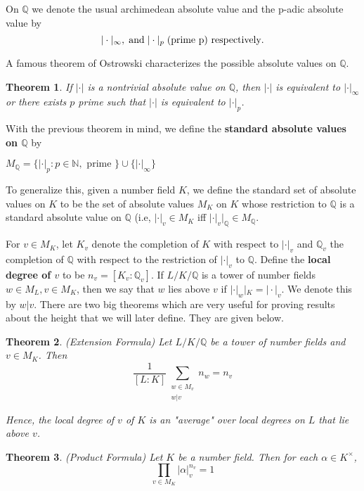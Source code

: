 \documentclass{amsart}
\newtheorem{thm}{Theorem}[section]
\newcommand{\N}{\mathbb{N}}
\newcommand{\Q}{\mathbb{Q}}
\begin{document}
On $\Q$ we denote the usual archimedean absolute value and the p-adic absolute value by $$|\cdot |_{\infty}, \hspace{1mm} \text{and} \hspace{1mm}  |\cdot |_p\hspace{1mm} \text{(prime p) respectively}.$$

A famous theorem of Ostrowski characterizes the possible absolute values on $\Q$. 

\begin{thm}
If $| \cdot |$ is a nontrivial absolute value on $\Q$, then  $| \cdot |$ is equivalent to  $| \cdot |_{\infty}$ or there exists $p$ prime such that  $| \cdot |$ is equivalent to  $| \cdot |_p$. 
\end{thm}


With the previous theorem in mind, we define the \textbf{standard absolute values on $\Q$} by 

$M_{\Q}=\{  | \cdot |_p : p \in \N, \text{ prime }\} \cup \{ | \cdot |_{\infty}\}$

To generalize this, given a number field $K$, we define the standard set of absolute values on $K$ to be the set of absolute values $M_K$ on $K$ whose restriction to $\Q$  is a standard absolute value on $\Q$ (i.e, $|\cdot|_v \in M_K$ iff $|\cdot|_v|_{\Q} \in M_{\Q}$. 

For $v \in M_K$, let $K_v$ denote the completion of $K$ with respect to  $| \cdot |_v$ and $\Q_v$ the completion of $\Q$ with respect to the restriction of $|\cdot|_v$ to $\Q$. Define the \textbf{local degree of $v$} to be $n_v=[K_v:\Q_v]$. If $L/K/\Q$ is a tower of number fields $w \in M_L, v \in M_K$, then we say that $w$ lies above $v$ if  $| \cdot |_w |_K =  | \cdot |_v$. We denote this by $w|v$. There are two big theorems which are very useful for proving results about the height that we will later define.  They are given below. 


\begin{thm}{(Extension Formula)}
Let $L/K/\Q$ be a tower of number fields and $v\in M_K$. 
Then $$\dfrac{1}{[L:K]} \sum\limits_{\substack{w \in M_v\\ w|v}} n_w=n_v$$ 

Hence, the local degree of $v$ of $K$ is an "average" over local degrees on $L$ that lie above $v$. 

\end{thm}


\begin{thm}{(Product Formula)} Let $K$ be a number field.  
Then for each $\alpha \in K^{\times}$, $$\prod_{v \in M_K} |\alpha |_v^{n_v} =1$$ 
\end{thm}
\end{document}
